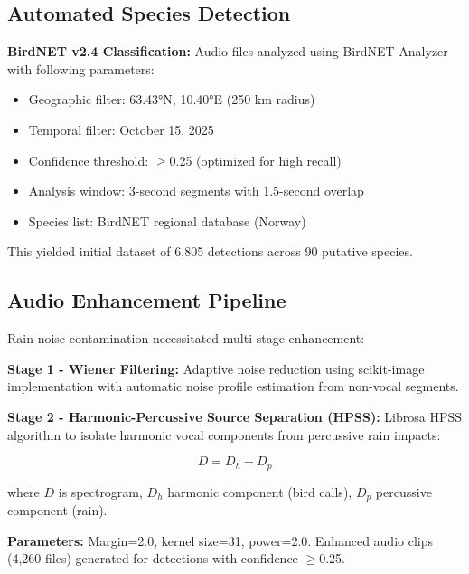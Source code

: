 \documentclass[twocolumn]{article}
\begin{document}
\subsection{Automated Species Detection}

\textbf{BirdNET v2.4 Classification:} Audio files analyzed using BirdNET Analyzer \citep{Kahl2021} with following parameters:

\begin{itemize}
\item Geographic filter: 63.43°N, 10.40°E (250 km radius)
\item Temporal filter: October 15, 2025
\item Confidence threshold: $\geq$0.25 (optimized for high recall)
\item Analysis window: 3-second segments with 1.5-second overlap
\item Species list: BirdNET regional database (Norway)
\end{itemize}

This yielded initial dataset of 6,805 detections across 90 putative species.

\subsection{Audio Enhancement Pipeline}

Rain noise contamination necessitated multi-stage enhancement:

\textbf{Stage 1 - Wiener Filtering:} Adaptive noise reduction using scikit-image implementation with automatic noise profile estimation from non-vocal segments.

\textbf{Stage 2 - Harmonic-Percussive Source Separation (HPSS):} Librosa HPSS algorithm \citep{Fitzgerald2010} to isolate harmonic vocal components from percussive rain impacts:

\begin{equation}
D = D_h + D_p
\end{equation}

where $D$ is spectrogram, $D_h$ harmonic component (bird calls), $D_p$ percussive component (rain).

\textbf{Parameters:} Margin=2.0, kernel size=31, power=2.0. Enhanced audio clips (4,260 files) generated for detections with confidence $\geq$0.25.
\end{document}
